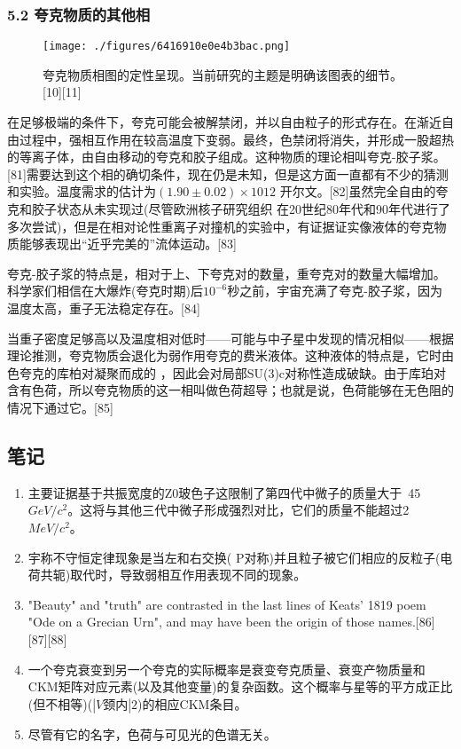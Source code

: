 \subsubsection{5.2 夸克物质的其他相}
\begin{figure}[ht]
\centering
\texttt{[image: ./figures/6416910e0e4b3bac.png]}
\caption{夸克物质相图的定性呈现。当前研究的主题是明确该图表的细节。[10][11]} \label{fig_Quark_12}
\end{figure}
在足够极端的条件下，夸克可能会被解禁闭，并以自由粒子的形式存在。在渐近自由过程中，强相互作用在较高温度下变弱。最终，色禁闭将消失，并形成一股超热的等离子体，由自由移动的夸克和胶子组成。这种物质的理论相叫夸克-胶子浆。[81]需要达到这个相的确切条件，现在仍是未知，但是这方面一直都有不少的猜测和实验。温度需求的估计为$(1.90±0.02)×1012$ 开尔文。[82]虽然完全自由的夸克和胶子状态从未实现过(尽管欧洲核子研究组织 在20世纪80年代和90年代进行了多次尝试)，但是在相对论性重离子对撞机的实验中，有证据证实像液体的夸克物质能够表现出“近乎完美的”流体运动。[83]

夸克-胶子浆的特点是，相对于上、下夸克对的数量，重夸克对的数量大幅增加。科学家们相信在大爆炸(夸克时期)后$10^{-6}$秒之前，宇宙充满了夸克-胶子浆，因为温度太高，重子无法稳定存在。[84]

当重子密度足够高以及温度相对低时——可能与中子星中发现的情况相似——根据理论推测，夸克物质会退化为弱作用夸克的费米液体。这种液体的特点是，它时由色夸克的库柏对凝聚而成的 ，因此会对局部SU(3)c对称性造成破缺。由于库珀对含有色荷，所以夸克物质的这一相叫做色荷超导；也就是说，色荷能够在无色阻的情况下通过它。[85]

\subsection{笔记}
\begin{enumerate}
\item 主要证据基于共振宽度的Z0玻色子这限制了第四代中微子的质量大于~45 $GeV/c^2$。这将与其他三代中微子形成强烈对比，它们的质量不能超过2 $MeV/c^2$。
\item 宇称不守恒定律现象是当左和右交换( P对称)并且粒子被它们相应的反粒子(电荷共轭)取代时，导致弱相互作用表现不同的现象。
\item "Beauty" and "truth" are contrasted in the last lines of Keats' 1819 poem "Ode on a Grecian Urn", and may have been the origin of those names.[86][87][88]
\item 一个夸克衰变到另一个夸克的实际概率是衰变夸克质量、衰变产物质量和CKM矩阵对应元素(以及其他变量)的复杂函数。这个概率与星等的平方成正比(但不相等)($|V\text{颈内}|2$)的相应CKM条目。
\item 尽管有它的名字，色荷与可见光的色谱无关。
\end{enumerate}

